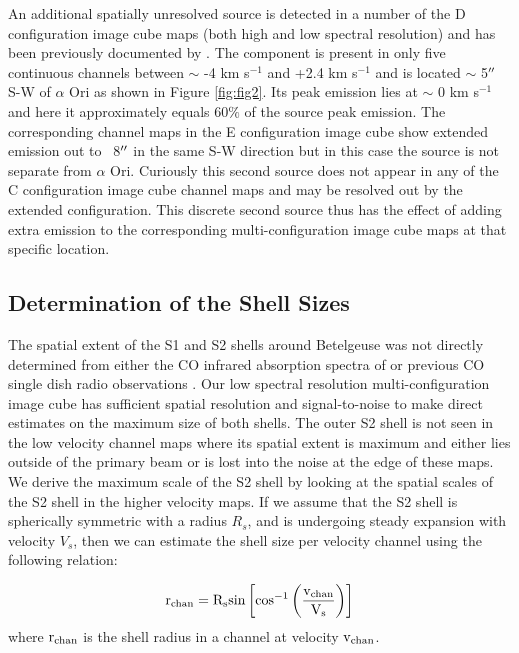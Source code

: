 \documentclass[preprint2]{aastex}
\begin{document}
An additional spatially unresolved source is detected in a number of the D configuration image cube maps (both high and low spectral resolution) and has been previously documented by \citet{2009AIPC.1094..868H}. The component is present in only five continuous channels between $\sim$ -4 km s${}^{-1}$ and +2.4 km s${}^{-1}$ and is located $\sim$ 5$\mbox{$^{\prime\prime}$}$ S-W of $\alpha$ Ori as shown in Figure \ref{fig:fig2}. Its peak emission lies at $\sim$ 0 km s${}^{-1}$ and here it approximately equals 60$\%$ of the source peak emission. The corresponding channel maps in the E configuration image cube show extended emission out to ~8$\mbox{$^{\prime\prime}$}$ in the same S-W direction but in this case the source is not separate from $\alpha$ Ori. Curiously this second source does not appear in any of the C configuration image cube channel maps and may be resolved out by the extended configuration. This discrete second source thus has the effect of adding extra emission to the corresponding multi-configuration image cube maps at that specific location.

\subsection{Determination of the Shell Sizes} \label{results3} 
The spatial extent of the S1 and S2 shells around Betelgeuse was not directly determined from either the CO infrared absorption spectra of \cite{1979ApJ...233L.135B} or previous CO single dish radio observations \citep{1980ApJ...242L..25K, 1987ApJ...313..400H, 1994ApJ...424L.127H}. Our low spectral resolution multi-configuration image cube has sufficient spatial resolution and signal-to-noise to make direct estimates on the maximum size of both shells. The outer S2 shell is not seen in the low velocity channel maps where its spatial extent is maximum and either lies outside of the primary beam or is lost into the noise at the edge of these maps. We derive the maximum scale of the S2 shell by looking at the spatial scales of the S2 shell in the higher velocity maps. If we assume that the S2 shell is spherically symmetric with a radius $R_{s}$, and is undergoing steady expansion with velocity $V_{s}$, then we can estimate the shell size per velocity channel using the following relation:

\begin{equation}
\rm{r_{chan}}=R_{s} \rm{sin}\left[\rm{cos}^{-1}\left(\frac{v_{chan}}{V_{s}}\right) \right]
\end{equation} 
where $\rm{r_{chan}}$ is the shell radius in a channel at velocity $\rm{v_{chan}}$. 
\end{document}
